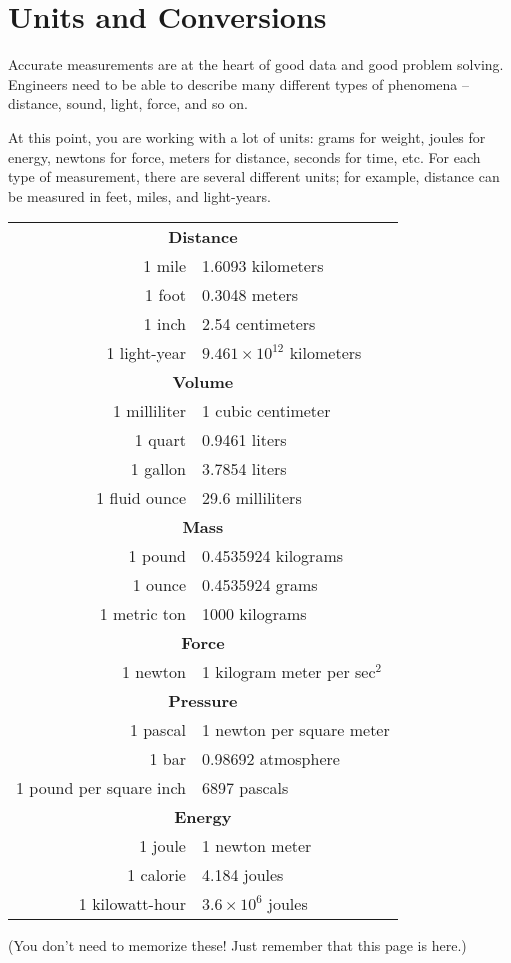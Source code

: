 \chapter{Units and Conversions}

Accurate measurements are at the heart of good data and good problem solving. Engineers need to be able to describe many different types of phenomena -- distance, sound, light, force, and so on.

At this point, you are working with a lot of units: grams for weight,
joules for energy, newtons for force, meters for distance, seconds for
time, etc. For each type of measurement, there are several different
units; for example, distance can be measured in feet, miles,
and light-years.

\begin{mdframed}[style=important, frametitle={Some Equalencies}]

\begin{tabular}{r | l}
  \hline
  \multicolumn{2}{c}{\textbf{Distance}}\\
  1 mile & 1.6093 kilometers \\
  1 foot & 0.3048 meters \\
  1 inch & 2.54 centimeters \\
  1 light-year & $9.461 \times 10^{12}$ kilometers\\
  \hline
  \multicolumn{2}{c}{\textbf{Volume}}\\
  1 milliliter & 1 cubic centimeter \\
  1 quart & 0.9461 liters \\
  1 gallon & 3.7854 liters \\
  1 fluid ounce & 29.6 milliliters \\
  \hline
  \multicolumn{2}{c}{\textbf{Mass}}\\
  1 pound & 0.4535924 kilograms\\
  1 ounce & 0.4535924 grams\\
  1 metric ton & 1000 kilograms \\
  \hline
  \multicolumn{2}{c}{\textbf{Force}}\\
  1 newton & 1 kilogram meter per sec$^2$\\
  \hline
  \multicolumn{2}{c}{\textbf{Pressure}}\\
  1 pascal & 1 newton per square meter \\
  1 bar & 0.98692 atmosphere \\
  1 pound per square inch & 6897 pascals \\
  \hline
  \multicolumn{2}{c}{\textbf{Energy}}\\
  1 joule & 1 newton meter \\
  1 calorie & 4.184 joules \\
  1 kilowatt-hour & $3.6 \times 10^{6}$ joules  \\
\end{tabular}

(You don't need to memorize these! Just remember that this page is here.)

\end{mdframed}

